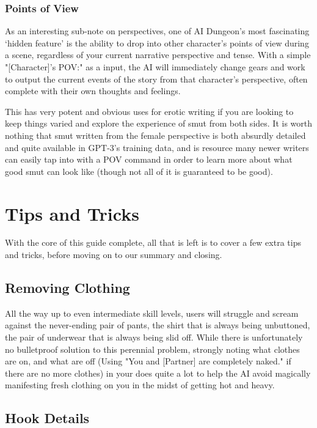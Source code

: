 ﻿\documentclass[Coomer-main.tex]{subfiles}
\begin{document}
\subsection{Points of View}

As an interesting sub-note on perspectives, one of AI Dungeon's most fascinating ‘hidden feature’ is the ability to drop into other character's points of view during a scene, regardless of your current narrative perspective and tense. With a simple "[Character]'s POV:" as a \story  input, the AI will immediately change gears and work to output the current events of the story from that character's perspective, often complete with their own thoughts and feelings.

This has very potent and obvious uses for erotic writing if you are looking to keep things varied and explore the experience of smut from both sides. It is worth nothing that smut written from the female perspective is both absurdly detailed and quite available in GPT-3's training data, and is resource many newer writers can easily tap into with a POV command in order to learn more about what good smut can look like (though not all of it is guaranteed to be good).

\chapter{Tips and Tricks}

With the core of this guide complete, all that is left is to cover a few extra tips and tricks, before moving on to our summary and closing.

\section{Removing Clothing}

All the way up to even intermediate skill levels, users will struggle and scream against the never-ending pair of pants, the shirt that is always being unbuttoned, the pair of underwear that is always being slid off. While there is unfortunately no bulletproof solution to this perennial problem, strongly noting what clothes are on, and what are off (Using "You and [Partner] are completely naked." if there are no more clothes) in your \rem does quite a lot to help the AI avoid magically manifesting fresh clothing on you in the midst of getting hot and heavy.

\section{Hook Details}
\end{document}
